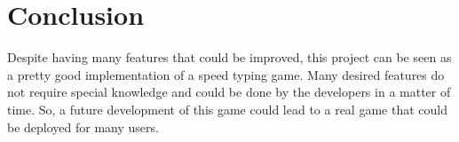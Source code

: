 \documentclass[a4paper,12pt,twoside]{article}
\begin{document}
	\section{Conclusion}
	
		Despite having many features that could be improved, this project can be seen as a pretty good implementation of a speed typing game. Many desired features do not require special knowledge and could be done by the developers in a matter of time. So, a future development of this game could lead to a real game that could be deployed for many users.
	
\end{document}

